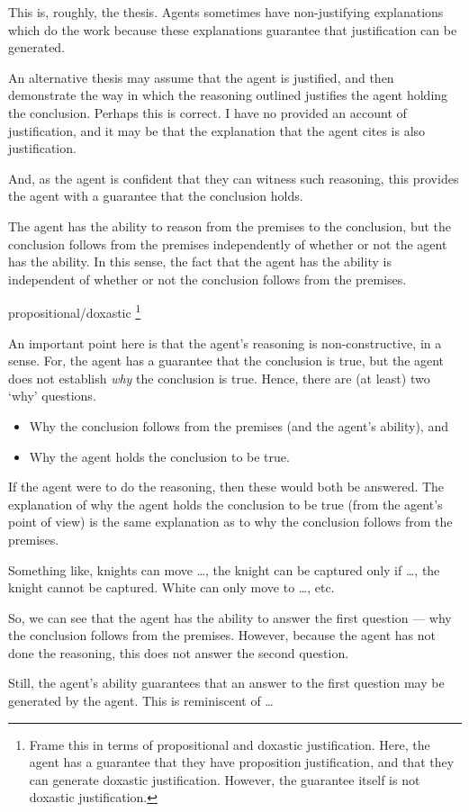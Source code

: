 \documentclass[10pt]{article}
\newcommand{\hozlinedash}[0]{%
  \noindent\hdashrule[0.5ex][c]{\textwidth}{.1pt}{2.5pt}
}
\begin{document}
\hozlinedash


This is, roughly, the thesis.
Agents sometimes have non-justifying explanations which do the work because these explanations guarantee that justification can be generated.

An alternative thesis may assume that the agent is justified, and then demonstrate the way in which the reasoning outlined justifies the agent holding the conclusion.
Perhaps this is correct.
I have no provided an account of justification, and it may be that the explanation that the agent cites is also justification.


And, as the agent is confident that they can witness such reasoning, this provides the agent with a guarantee that the conclusion holds.

The agent has the ability to reason from the premises to the conclusion, but the conclusion follows from the premises independently of whether or not the agent has the ability.
In this sense, the fact that the agent has the ability is independent of whether or not the conclusion follows from the premises.




propositional/doxastic\nolinebreak
\footnote{
  Frame this in terms of propositional and doxastic justification.
  Here, the agent has a guarantee that they have proposition justification, and that they can generate doxastic justification.
  However, the guarantee itself is not doxastic justification.
}


\begin{note}[Constructive]
  An important point here is that the agent's reasoning is non-constructive, in a sense.
  For, the agent has a guarantee that the conclusion is true, but the agent does not establish \emph{why} the conclusion is true.
  Hence, there are (at least) two `why' questions.
  \begin{itemize}
  \item Why the conclusion follows from the premises (and the agent's ability), and
  \item Why the agent holds the conclusion to be true.
  \end{itemize}
  If the agent were to do the reasoning, then these would both be answered.
  The explanation of why the agent holds the conclusion to be true (from the agent's point of view) is the same explanation as to why the conclusion follows from the premises.

  Something like, knights can move \dots, the knight can be captured only if \dots, the knight cannot be captured.
  White can only move to \dots, etc.\

  So, we can see that the agent has the ability to answer the first question --- why the conclusion follows from the premises.
  However, because the agent has not done the reasoning, this does not answer the second question.

  Still, the agent's ability guarantees that an answer to the first question may be generated by the agent.
  This is reminiscent of \citeauthor{Davidson:2001aa} \dots
\end{note}
\end{document}
